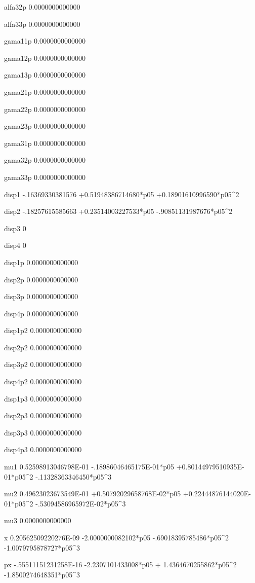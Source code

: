  alfa32p
   0.0000000000000 
  
 alfa33p
   0.0000000000000 
  
 gama11p
   0.0000000000000 
  
 gama12p
   0.0000000000000 
  
 gama13p
   0.0000000000000 
  
 gama21p
   0.0000000000000 
  
 gama22p
   0.0000000000000 
  
 gama23p
   0.0000000000000 
  
 gama31p
   0.0000000000000 
  
 gama32p
   0.0000000000000 
  
 gama33p
   0.0000000000000 
  
 disp1  
  -.16369330381576 +0.51948386714680*p05 +0.18901610996590*p05^2 
  
 disp2  
  -.18257615585663 +0.23514003227533*p05  -.90851131987676*p05^2 
  
 disp3  
 0 
  
 disp4  
 0 
  
 disp1p 
   0.0000000000000 
  
 disp2p 
   0.0000000000000 
  
 disp3p 
   0.0000000000000 
  
 disp4p 
   0.0000000000000 
  
 disp1p2
   0.0000000000000 
  
 disp2p2
   0.0000000000000 
  
 disp3p2
   0.0000000000000 
  
 disp4p2
   0.0000000000000 
  
 disp1p3
   0.0000000000000 
  
 disp2p3
   0.0000000000000 
  
 disp3p3
   0.0000000000000 
  
 disp4p3
   0.0000000000000 
  
 mu1    
  0.52598913046798E-01  -.18986046465175E-01*p05 +0.80144979510935E-01*p05^2  -.11328363346450*p05^3 
  
 mu2    
  0.49623023673549E-01 +0.50792029658768E-02*p05 +0.22444876144020E-01*p05^2  -.53094586965972E-02*p05^3 
  
 mu3    
   0.0000000000000 
  
 x      
  0.20562509220276E-09  -2.0000000082102*p05  -.69018395785486*p05^2  -1.0079795878727*p05^3 
  
 px     
  -.55511151231258E-16  -2.2307101433008*p05 + 1.4364670255862*p05^2  -1.8500274648351*p05^3 
  
